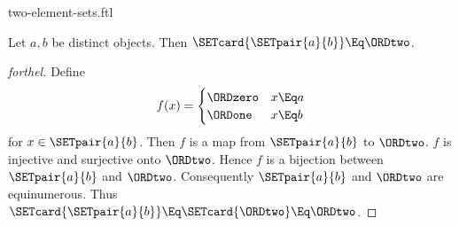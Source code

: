 \documentclass{stex}
\begin{document}
\begin{smodule}{two-element-sets.ftl}

\begin{proposition}[forthel,id=SET_THEORY_07_5465279026954240]
  Let $a, b$ be distinct objects.
  Then $\SETcard{\SETpair{a}{b}} \Eq \ORDtwo$.
\end{proposition}
\begin{proof}[forthel]
  Define \[ f(x) =
    \begin{cases}
      \ORDzero & x \Eq a
      \\
      \ORDone & x \Eq b
    \end{cases} \]
  for $x \in \SETpair{a}{b}$.
  Then $f$ is a map from $\SETpair{a}{b}$ to $\ORDtwo$.
  $f$ is injective and surjective onto $\ORDtwo$.
  Hence $f$ is a bijection between $\SETpair{a}{b}$ and $\ORDtwo$.
  Consequently $\SETpair{a}{b}$ and $\ORDtwo$ are equinumerous.
  Thus $\SETcard{\SETpair{a}{b}} \Eq \SETcard{\ORDtwo} \Eq \ORDtwo$.
\end{proof}
\end{smodule}
\end{document}
